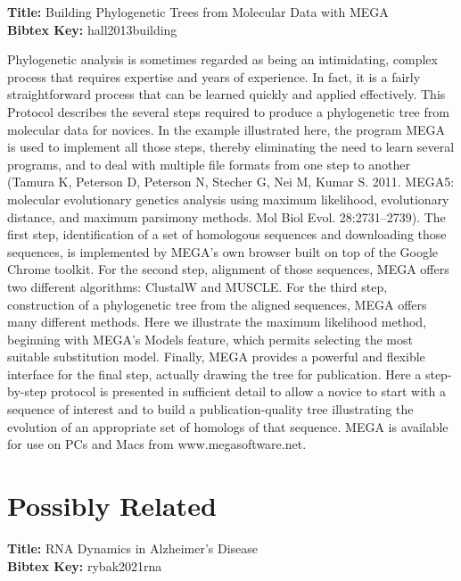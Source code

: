 \documentclass[11pt]{article}
\begin{document}
\textbf{Title: }Building Phylogenetic Trees from Molecular Data with MEGA\\
\textbf{Bibtex Key: }hall2013building\\
\cite{hall2013building}

Phylogenetic analysis is sometimes regarded as being an intimidating, complex process that requires expertise and years of experience. 
In fact, it is a fairly straightforward process that can be learned quickly and applied effectively. 
This Protocol describes the several steps required to produce a phylogenetic tree from molecular data for novices. 
In the example illustrated here, the program MEGA is used to implement all those steps, thereby eliminating the need to learn several programs, and to deal with multiple file formats from one step to another (Tamura K, Peterson D, Peterson N, Stecher G, Nei M, Kumar S. 2011. MEGA5: molecular evolutionary genetics analysis using maximum likelihood, evolutionary distance, and maximum parsimony methods. Mol Biol Evol. 28:2731–2739). 
The first step, identification of a set of homologous sequences and downloading those sequences, is implemented by MEGA's own browser built on top of the Google Chrome toolkit. 
For the second step, alignment of those sequences, MEGA offers two different algorithms: ClustalW and MUSCLE. 
For the third step, construction of a phylogenetic tree from the aligned sequences, MEGA offers many different methods. 
Here we illustrate the maximum likelihood method, beginning with MEGA's Models feature, which permits selecting the most suitable substitution model. 
Finally, MEGA provides a powerful and flexible interface for the final step, actually drawing the tree for publication. 
Here a step-by-step protocol is presented in sufficient detail to allow a novice to start with a sequence of interest and to build a publication-quality tree illustrating the evolution of an appropriate set of homologs of that sequence. 
MEGA is available for use on PCs and Macs from www.megasoftware.net.

\section{Possibly Related}

\textbf{Title: }RNA Dynamics in Alzheimer’s Disease\\
\textbf{Bibtex Key: }rybak2021rna\\
\cite{rybak2021rna}
\end{document}

